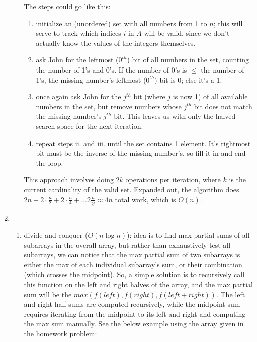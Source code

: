 \documentclass[12pt]{article}
\begin{document}
\begin{enumerate}
\begin{enumerate}
        The steps could go like this:

        \begin{enumerate}
            \item initialize an (unordered) set with all numbers from 1 to $n$; this will serve to track which indices $i$ in 
            $A$ will be valid, since we don't actually know the values of the integers themselves.

            \item ask John for the leftmost ($0^{th}$) bit of all numbers in the set, counting the number of 1's and 0's. If the number of 0's 
            is $\leq$ the number of 1's, the missing number's leftmost ($0^{th}$) bit is 0; else it's a 1.

            \item once again ask John for the $j^{th}$ bit (where $j$ is now 1) of all available numbers in the set, but remove numbers whose 
            $j^{th}$ bit does not match the missing number's $j^{th}$ bit. This leaves us with only the halved search space 
            for the next iteration.

            \item repeat steps ii. and iii. until the set contains 1 element. It's rightmost bit must be the inverse of the 
            missing number's, so fill it in and end the loop.
        \end{enumerate}

        This approach involves doing $2k$ operations per iteration, where $k$ is the current cardinality of the valid set. 
        Expanded out, the algorithm does $2n + 2 \cdot \frac{n}{2} + 2 \cdot \frac{n}{4} + \dots 2 \frac{n}{2^i} \approx 4n$ 
        total work, which is $O(n)$.

    \end{enumerate}
    
    \item 
    
    \begin{enumerate}
        \item divide and conquer ($O(n\log n)$):
        idea is to find max partial sums of all subarrays in the overall array, but rather than 
        exhaustively test all subarrays, we can notice that the max partial sum of two subarrays is 
        either the max of each individual subarray's sum, or their combination (which crosses the midpoint). 
        So, a simple solution is to recursively call this function on the left and right halves of the array, and 
        the max partial sum will be the $max(f(left), f(right), f(left + right))$. The left and right half sums 
        are computed recursively, while the midpoint sum requires iterating from the midpoint to its left 
        and right and computing the max sum manually. See the below example using the array given in the homework problem:


\end{enumerate}
\end{enumerate}
\end{document}
